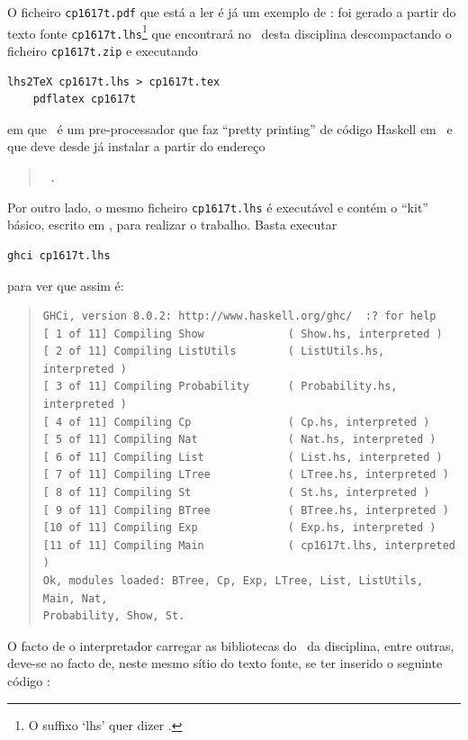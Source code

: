 \documentclass[a4paper]{article}
\begin{document}
O ficheiro \texttt{cp1617t.pdf} que está a ler é já um exemplo de : foi gerado a partir do texto fonte \texttt{cp1617t.lhs}\footnote{O
suffixo `lhs' quer dizer \emph{}.} que encontrará
no \MaterialPedagogico\ desta disciplina descompactando o ficheiro \texttt{cp1617t.zip}
e executando
\begin{Verbatim}[fontsize=\small]
    lhs2TeX cp1617t.lhs > cp1617t.tex
    pdflatex cp1617t
\end{Verbatim}
em que \texttt\LhsToTeX\ é um pre-processador que faz ``pretty printing''
de código Haskell em \Latex\ e que deve desde já instalar a partir do endereço
\begin{quote}\tt\small
{}.
\end{quote}
Por outro lado, o mesmo ficheiro \texttt{cp1617t.lhs} é executável e contém
o ``kit'' básico, escrito em \Haskell, para realizar o trabalho. Basta executar
\begin{Verbatim}[fontsize=\small]
    ghci cp1617t.lhs
\end{Verbatim}
para ver que assim é:
\begin{quote}
\begin{Verbatim}[fontsize=\small]
GHCi, version 8.0.2: http://www.haskell.org/ghc/  :? for help
[ 1 of 11] Compiling Show             ( Show.hs, interpreted )
[ 2 of 11] Compiling ListUtils        ( ListUtils.hs, interpreted )
[ 3 of 11] Compiling Probability      ( Probability.hs, interpreted )
[ 4 of 11] Compiling Cp               ( Cp.hs, interpreted )
[ 5 of 11] Compiling Nat              ( Nat.hs, interpreted )
[ 6 of 11] Compiling List             ( List.hs, interpreted )
[ 7 of 11] Compiling LTree            ( LTree.hs, interpreted )
[ 8 of 11] Compiling St               ( St.hs, interpreted )
[ 9 of 11] Compiling BTree            ( BTree.hs, interpreted )
[10 of 11] Compiling Exp              ( Exp.hs, interpreted )
[11 of 11] Compiling Main             ( cp1617t.lhs, interpreted )
Ok, modules loaded: BTree, Cp, Exp, LTree, List, ListUtils, Main, Nat,
Probability, Show, St.
\end{Verbatim}
\end{quote}
O facto de o interpretador carregar as bibliotecas do \MaterialPedagogico\ da
disciplina, entre outras, deve-se ao facto de, neste mesmo sítio do texto
fonte, se ter inserido o seguinte código \Haskell:
\end{document}
